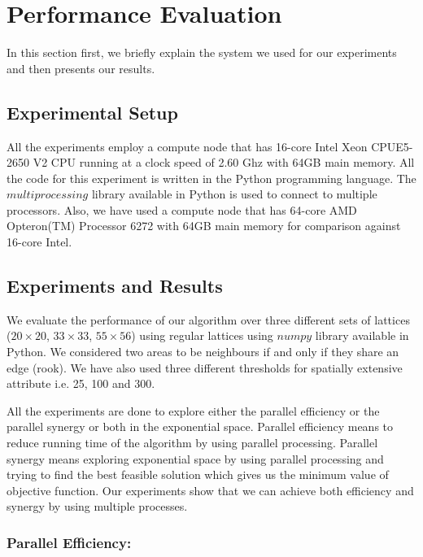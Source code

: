 \documentclass[conference]{IEEEtran}
\begin{document}
\section{Performance Evaluation}
In this section first, we briefly explain the system we used for our experiments and then presents our results.
\subsection{Experimental Setup}
All the experiments employ a compute node that has 16-core Intel Xeon
CPUE5-2650 V2 CPU running at a clock speed of 2.60 Ghz with 64GB main memory.
All the code for this experiment is written in the Python programming language.
The $multiprocessing$ library available in Python is used to connect to multiple
processors. Also, we have used a compute node that has 64-core AMD Opteron(TM)
Processor 6272 with 64GB main memory for comparison against 16-core Intel.

\subsection{Experiments and Results}

We evaluate the performance of our algorithm over
three different sets
of lattices ($20\times 20$, $33\times 33$, $55\times 56$) 
using regular lattices using $numpy$ library available in Python.
We considered two areas to be neighbours if and only if they share
an edge (rook). We have also used three different thresholds for spatially
extensive attribute i.e. 25, 100 and 300.

All the experiments are done to explore either the parallel
efficiency or the parallel synergy or both in the exponential space. Parallel
efficiency means to reduce running time of the algorithm by using parallel
processing. Parallel synergy means exploring exponential space by using parallel
processing and trying to find the best feasible solution which gives us the
minimum value of objective function. Our experiments show that we can achieve
both efficiency and synergy by using multiple processes.

\subsubsection{Parallel Efficiency:}
\end{document}
